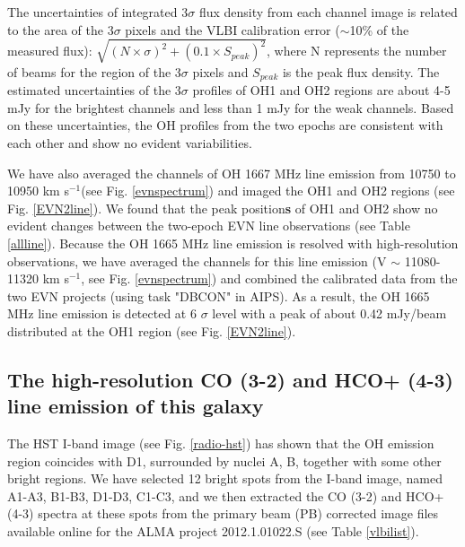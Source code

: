 \documentclass[]{aa} %
\newcommand{\kms}{km s$^{-1}$\xspace}
\begin{document}
  The uncertainties of integrated 3$\sigma$ flux density from each channel image is related to the area of the 3$\sigma$ pixels and the VLBI calibration error ($\sim$10\% of the measured flux): $\sqrt{(N \times \sigma)^{2}+(0.1 \times S_{peak})^2}$, where N represents the number of beams for the region of the 3$\sigma$ pixels and $S_{peak}$ is the peak flux density. The estimated uncertainties of the 3$\sigma$ profiles of OH1 and OH2 regions are about 4-5 mJy for the brightest channels and less than 1 mJy for the weak channels.  Based on these uncertainties, the OH profiles from the two epochs are consistent with each other and show no evident variabilities.

  We have also averaged the channels of OH 1667 MHz line emission from 10750 to 10950 \kms (see Fig. \ref{evnspectrum}) and imaged the OH1 and OH2 regions (see Fig. \ref{EVN2line}). We found that the peak position\textbf{s} of OH1 and OH2 show no evident changes between the two-epoch EVN line observations (see Table \ref{allline}).
  Because the OH 1665 MHz line emission is resolved with high-resolution observations, we have averaged the channels for this line emission (V $\sim$ 11080-11320 \kms, see Fig. \ref{evnspectrum}) and combined the calibrated data from the two EVN projects (using task "DBCON" in AIPS). As a result, the OH 1665 MHz line emission is detected at 6 $\sigma$ level with a peak of about 0.42 mJy/beam distributed at the OH1 region (see Fig. \ref{EVN2line}).

\subsection{The high-resolution CO (3-2) and HCO+ (4-3) line emission of this galaxy}
The HST I-band image (see Fig. \ref{radio-hst}) has shown that the OH emission region coincides with D1, surrounded by nuclei A, B, together with some other bright regions. We have selected 12 bright spots from the I-band image, named A1-A3, B1-B3, D1-D3, C1-C3, and we then extracted the CO (3-2) and HCO+ (4-3) spectra at these spots from the primary beam (PB) corrected image files %
available online for the ALMA project 2012.1.01022.S (see Table \ref{vlbilist}).  %
\end{document}

